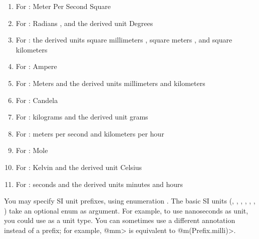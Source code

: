 \begin{enumerate}
\item For :
  Meter Per Second Square 

\item For :
  Radians ,
  and the derived unit
  Degrees 

\item For :
  the derived units
  square millimeters ,
  square meters , and
  square kilometers 

\item For :
  Ampere 

\item For :
  Meters 
  and the derived units
  millimeters  and
  kilometers 

\item For :
  Candela 

\item For :
  kilograms 
  and the derived unit
  grams 

\item For :
  meters per second  and
  kilometers per hour 

\item For :
  Mole 

\item For :
  Kelvin 
  and the derived unit
  Celsius 

\item For :
  seconds 
  and the derived units
  minutes  and
  hours 
\end{enumerate}


You may specify SI unit prefixes, using enumeration .
The basic SI units
(, , , , ,
 , )
take an optional  enum as argument.
For example, to use nanoseconds as unit, you could use
 as a unit type.
You can sometimes use a different annotation instead of a prefix;
for example, \<@mm> is equivalent to \<@m(Prefix.milli)>.

